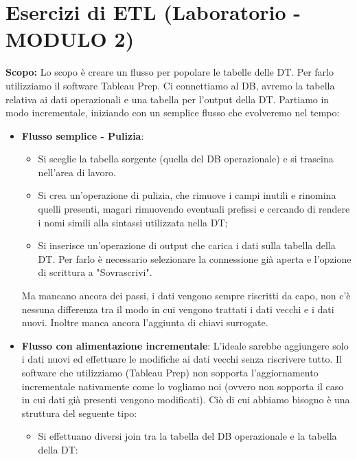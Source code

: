 \section{Esercizi di ETL (Laboratorio -  MODULO 2)}
\textbf{Scopo:}\newline
Lo scopo è creare un flusso per popolare le tabelle delle DT. Per farlo utilizziamo il software Tableau Prep. Ci connettiamo al DB, avremo la tabella relativa ai dati operazionali e una tabella per l'output della DT.\newline
Partiamo in modo incrementale, iniziando con un semplice flusso che evolveremo nel tempo:
\begin{itemize}
	\item \textbf{Flusso semplice - Pulizia}: \begin{itemize}
		\item Si sceglie la tabella sorgente (quella del DB operazionale) e si trascina nell'area di lavoro.
		\item Si crea un'operazione di pulizia, che rimuove i campi inutili e rinomina quelli presenti, magari rimuovendo eventuali prefissi e cercando di rendere i nomi simili alla sintassi utilizzata nella DT;
		\item Si inserisce un'operazione di output che carica i dati sulla tabella della DT. Per farlo è necessario selezionare la connessione già aperta e l'opzione di scrittura a "Sovrascrivi".
	\end{itemize}
	Ma mancano ancora dei passi, i dati vengono sempre riscritti da capo, non c'è nessuna differenza tra il modo in cui vengono trattati i dati vecchi e i dati nuovi. Inoltre manca ancora l'aggiunta di chiavi surrogate.
	\item \textbf{Flusso con alimentazione incrementale}:
	L'ideale sarebbe aggiungere solo i dati nuovi ed effettuare le modifiche ai dati vecchi senza riscrivere tutto. Il software che utilizziamo (Tableau Prep) non sopporta l'aggiornamento incrementale nativamente come lo vogliamo noi (ovvero non sopporta il caso in cui dati già presenti vengono modificati).\newline
	Ciò di cui abbiamo bisogno è una struttura del seguente tipo:
	\begin{itemize}
		\item Si effettuano diversi join tra la tabella del DB operazionale e la tabella della DT:
		\begin{itemize}

\end{itemize}
\end{itemize}
\end{itemize}
